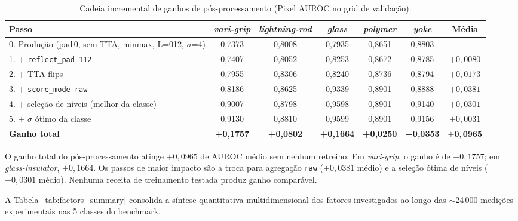 \documentclass[conference]{IEEEtran}
\begin{document}
\begin{table}[htb]
\centering
\caption{Cadeia incremental de ganhos de pós-processamento (Pixel AUROC no grid de validação).}
\label{tab:incremental}
\begin{tabular}{@{}lcccccc@{}}
\toprule
Passo & \textit{vari-grip} & \textit{lightning-rod} & \textit{glass} & \textit{polymer} & \textit{yoke} & \textbf{Média} \\
\midrule
0. Produção (pad\,0, sem TTA, minmax, L=012, $\sigma$=4) & 0,7373 & 0,8008 & 0,7935 & 0,8651 & 0,8803 & --- \\
1. + \texttt{reflect\_pad 112}                              & 0,7407 & 0,8052 & 0,8253 & 0,8672 & 0,8785 & $+0{,}0080$ \\
2. + TTA flips                                              & 0,7955 & 0,8306 & 0,8240 & 0,8736 & 0,8794 & $+0{,}0173$ \\
3. + \texttt{score\_mode raw}                               & 0,8186 & 0,8625 & 0,9339 & 0,8901 & 0,8888 & $+0{,}0381$ \\
4. + seleção de níveis (melhor da classe)                   & 0,9007 & 0,8798 & 0,9598 & 0,8901 & 0,9140 & $+0{,}0301$ \\
5. + $\sigma$ ótimo da classe                               & 0,9130 & 0,8810 & 0,9599 & 0,8901 & 0,9156 & $+0{,}0031$ \\
\midrule
\textbf{Ganho total}                                        & \textbf{+0,1757} & \textbf{+0,0802} & \textbf{+0,1664} & \textbf{+0,0250} & \textbf{+0,0353} & $\mathbf{+0{,}0965}$ \\
\bottomrule
\end{tabular}
\end{table}

O ganho total do pós-processamento atinge $+0{,}0965$ de AUROC médio sem nenhum retreino. Em \textit{vari-grip}, o ganho é de $+0{,}1757$; em \textit{glass-insulator}, $+0{,}1664$. Os passos de maior impacto são a troca para agregação \texttt{raw} ($+0{,}0381$ médio) e a seleção ótima de níveis ($+0{,}0301$ médio). Nenhuma receita de treinamento testada produz ganho comparável.

A Tabela~\ref{tab:factors_summary} consolida a síntese quantitativa multidimensional dos fatores investigados ao longo das $\sim$24\,000 medições experimentais nas 5 classes do benchmark.
\end{document}
